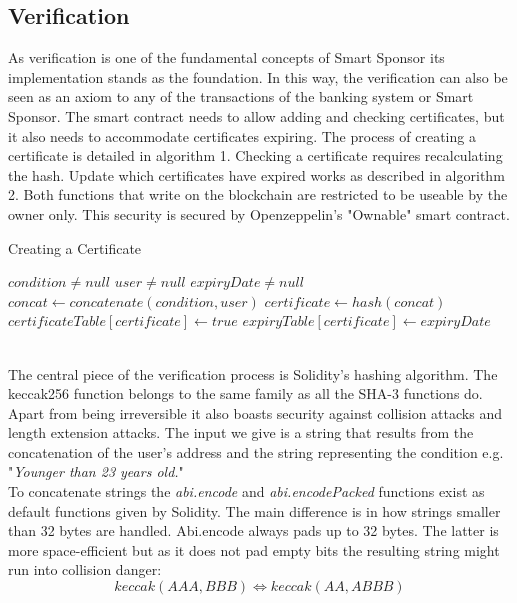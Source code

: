 \subsection{Verification}
As verification is one of the fundamental concepts of Smart Sponsor its implementation stands as the foundation. In this way, the verification can also be seen as an axiom to any of the transactions of the banking system or Smart Sponsor. The smart contract needs to allow adding and checking certificates, but it also needs to accommodate certificates expiring. The process of creating a certificate is detailed in algorithm 1. Checking a certificate requires recalculating the hash. Update which certificates have expired works as described in algorithm 2. Both functions that write on the blockchain are restricted to be useable by the owner only. This security is secured by Openzeppelin's "Ownable" smart contract\cite{Zeppelin}.\\
\begin{algorithm}
\caption{Creating a Certificate}\label{alg:create}
\begin{algorithmic}
\Require $condition \neq null$
\Require $user \neq null$
\Require $expiryDate \neq null$
\State $concat \gets concatenate(condition, user)$ 
\State $certificate \gets hash(concat)$
    \State $certificateTable[certificate] \gets true $
\EndIf
\State $expiryTable[certificate] \gets expiryDate$
\end{algorithmic}
\end{algorithm}
\\
The central piece of the verification process is Solidity's hashing algorithm. The keccak256 function belongs to the same family as all the SHA-3 functions do. Apart from being irreversible it also boasts security against collision attacks and length extension attacks. The input we give is a string that results from the concatenation of the user's address and the string representing the condition e.g. "\emph{Younger than 23 years old.}"\\
To concatenate strings the \emph{abi.encode} and \emph{abi.encodePacked} functions exist as default functions given by Solidity. The main difference is in how strings smaller than 32 bytes are handled. Abi.encode always pads up to 32 bytes. The latter is more space-efficient but as it does not pad empty bits the resulting string might run into collision danger:
\begin{equation*}
    keccak(AAA, BBB) \Longleftrightarrow keccak(AA, ABBB)
\end{equation*}

